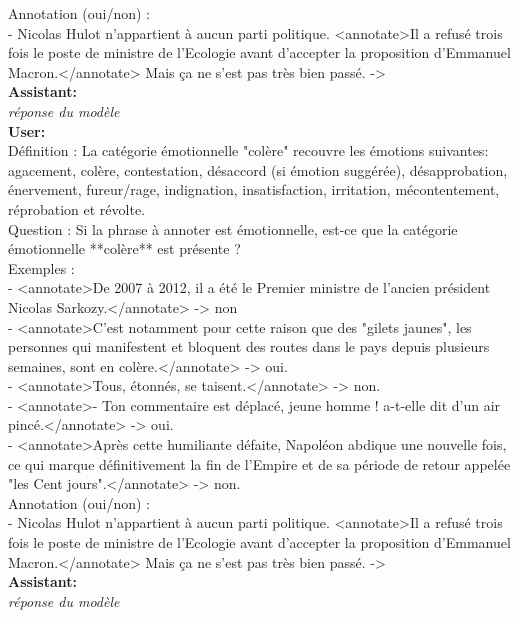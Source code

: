 {Annotation (oui/non) :\\
- Nicolas Hulot n’appartient à aucun parti politique. <annotate>Il a refusé trois fois le poste de ministre de l’Ecologie avant d’accepter la proposition d’Emmanuel Macron.</annotate> Mais ça ne s’est pas très bien passé.  -> \\

\textbf{Assistant:}\\
\textit{réponse du modèle}\\

\textbf{User:}\\
Définition : La catégorie émotionnelle "colère" recouvre les émotions suivantes: agacement, colère, contestation, désaccord (si émotion suggérée), désapprobation, énervement, fureur/rage, indignation, insatisfaction, irritation, mécontentement, réprobation et révolte.\\

Question : Si la phrase à annoter est émotionnelle, est-ce que la catégorie émotionnelle **colère** est présente ?\\

Exemples :\\
- <annotate>De 2007 à 2012, il a été le Premier ministre de l'ancien président Nicolas Sarkozy.</annotate> -> non\\
- <annotate>C'est notamment pour cette raison que des "gilets jaunes", les personnes qui manifestent et bloquent des routes dans le pays depuis plusieurs semaines, sont en colère.</annotate> -> oui.\\
- <annotate>Tous, étonnés, se taisent.</annotate> -> non.\\
- <annotate>- Ton commentaire est déplacé, jeune homme ! a-t-elle dit d'un air pincé.</annotate> -> oui.\\
- <annotate>Après cette humiliante défaite, Napoléon abdique une nouvelle fois, ce qui marque définitivement la fin de l'Empire et de sa période de retour appelée "les Cent jours".</annotate> -> non.\\

Annotation (oui/non) :\\
- Nicolas Hulot n’appartient à aucun parti politique. <annotate>Il a refusé trois fois le poste de ministre de l’Ecologie avant d’accepter la proposition d’Emmanuel Macron.</annotate> Mais ça ne s’est pas très bien passé.  -> \\

\textbf{Assistant:}\\
\textit{réponse du modèle}\\

}

